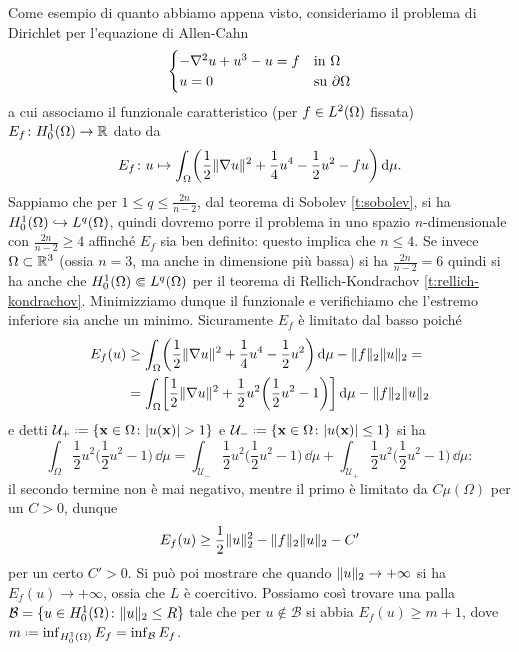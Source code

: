 Come esempio di quanto abbiamo appena visto, consideriamo il problema di Dirichlet per l'equazione di Allen-Cahn
\begin{equation}
    \begin{cases}
        -\lap u+u^3-u=f & \text{in }\Omega\\
        u=0             & \text{su }\boundary\Omega
    \end{cases}
    \label{eq:problema-dirichlet-allen-cahn}
\end{equation}
a cui associamo il funzionale caratteristico (per $f\in\leb[2]{\Omega}$ fissata) $E_f\colon\sobHc[1]{\Omega}\to\R$ dato da
\begin{equation}
    E_f\colon u\mapsto
    \int_\Omega\biggl(\frac12\norm{\grad u}^2+\frac14u^4-\frac12u^2-fu\biggr)\,\dd\mu.
    \label{eq:funzionale-energia-allen-cahn}
\end{equation}
Sappiamo che per $1\le q\le\frac{2n}{n-2}$, dal teorema di Sobolev \ref{t:sobolev}, si ha $\sobHc[1]{\Omega}\emb\leb[q]{\Omega}$, quindi dovremo porre il problema in uno spazio $n$-dimensionale con $\frac{2n}{n-2}\ge 4$ affinch\'e $E_f$ sia ben definito: questo implica che $n\le 4$.
Se invece $\Omega\subset\R^3$ (ossia $n=3$, ma anche in dimensione più bassa) si ha $\frac{2n}{n-2}=6$ quindi si ha anche che $\sobHc[1]{\Omega}\cemb\leb[q]{\Omega}$ per il teorema di Rellich-Kondrachov \ref{t:rellich-kondrachov}.
Minimizziamo dunque il funzionale e verifichiamo che l'estremo inferiore sia anche un minimo.
Sicuramente $E_f$ è limitato dal basso poich\'e
\begin{equation}
    \begin{split}
        E_f(u)&\ge
        \int_\Omega\biggl(\frac12\norm{\grad u}^2+\frac14u^4-\frac12u^2\biggr)\,\dd\mu-\norm{f}_2\norm{u}_2=\\ &=
        \int_\Omega\biggl[\frac12\norm{\grad u}^2+\frac12u^2\biggl(\frac12u^2-1\biggr)\biggr]\,\dd\mu-\norm{f}_2\norm{u}_2
    \end{split}
\end{equation}
e detti $\mathcal{U}_+\defeq\{\vec x\in\Omega\colon\abs{u(\vec x)}>1\}$ e $\mathcal{U}_-\defeq\{\vec x\in\Omega\colon\abs{u(\vec x)}\le 1\}$ si ha
\begin{equation}
    \int_\Omega\frac12u^2\biggl(\frac12u^2-1\biggr)\,\dd\mu=
    \int_{\mathcal{U}_-}\frac12u^2\biggl(\frac12u^2-1\biggr)\,\dd\mu+\int_{\mathcal{U}_+}\frac12u^2\biggl(\frac12u^2-1\biggr)\,\dd\mu:
\end{equation}
il secondo termine non è mai negativo, mentre il primo è limitato da $C\mu(\Omega)$ per un $C>0$, dunque
\begin{equation}
    E_f(u)\ge\frac12\norm{u}_2^2-\norm{f}_2\norm{u}_2-C'
\end{equation}
per un certo $C'>0$.
Si può poi mostrare che quando $\norm{u}_2\to+\infty$ si ha $E_f(u)\to+\infty$, ossia che $L$ è coercitivo.
Possiamo cos\`i trovare una palla $\mathcal{B}=\{u\in\sobHc[1]{\Omega}\colon\norm{u}_2\le R\}$ tale che per $u\notin\mathcal{B}$ si abbia $E_f(u)\ge m+1$, dove $m\defeq\inf_{\sobHc[1]{\Omega}}E_f=\inf_\mathcal{B}E_f$.

